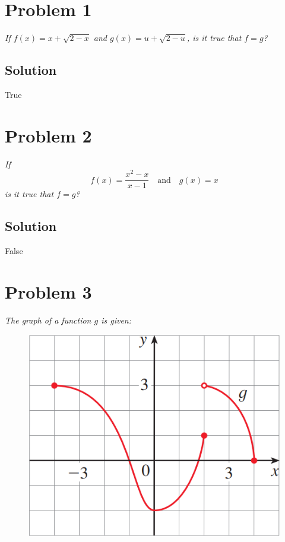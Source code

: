 \documentclass[11pt]{article}
\begin{document}
	
\section*{Problem 1}

\textit{If $f(x)=x+\sqrt{2-x}$ and $g(x)=u+\sqrt{2-u}$, is it true that $f=g$?}

\subsection*{Solution}

True


\section*{Problem 2}

\textit{If $$f(x)=\frac{x^2-x}{x-1} \quad\mathrm{and}\quad g(x)=x$$ is it true that $f=g$?}

\subsection*{Solution}

False

\section*{Problem 3}

\textit{The graph of a function $g$ is given:}

\begin{figure}[h]
	\centering
	\includegraphics[width=0.3\linewidth]{figs/1.1.3}
\end{figure}
\end{document}

